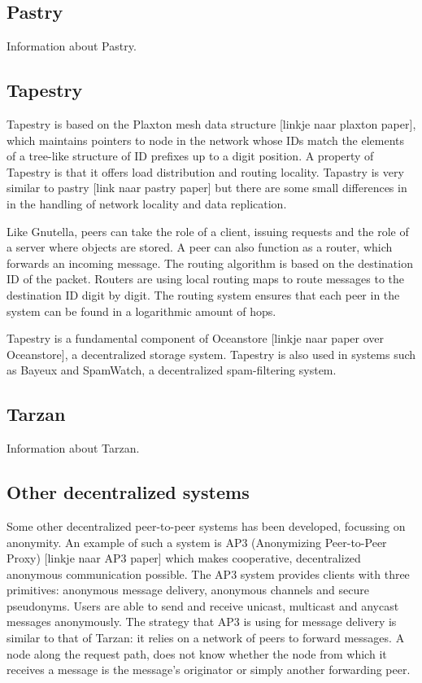 \documentclass[journal]{IEEEtran}
\begin{document}
		\subsection{Pastry}
			Information about Pastry.
		

		\subsection{Tapestry}
			Tapestry is based on the Plaxton mesh data structure [linkje naar plaxton paper], which maintains pointers to node in the network whose IDs match the elements of a tree-like structure of ID prefixes up to a digit position. A property of Tapestry is that it offers load distribution and routing locality. Tapastry is very similar to pastry [link naar pastry paper] but there are some small differences in in the handling of network locality and data replication.
		
			Like Gnutella, peers can take the role of a client, issuing requests and the role of a server where objects are stored. A peer can also function as a router, which forwards an incoming message. The routing algorithm is based on the destination ID of the packet. Routers are using local routing maps to route messages to the destination ID digit by digit. The routing system ensures that each peer in the system can be found in a logarithmic amount of hops.
		
			Tapestry is a fundamental component of Oceanstore [linkje naar paper over Oceanstore], a decentralized storage system. Tapestry is also used in systems such as Bayeux and SpamWatch, a decentralized spam-filtering system.
		
		\subsection{Tarzan}
			Information about Tarzan.
		
		\subsection{Other decentralized systems}
			Some other decentralized peer-to-peer systems has been developed, focussing on anonymity. An example of such a system is AP3 (Anonymizing Peer-to-Peer Proxy) [linkje naar AP3 paper] which makes cooperative, decentralized anonymous communication possible. The AP3 system provides clients with three primitives: anonymous message delivery, anonymous channels and secure pseudonyms. Users are able to send and receive unicast, multicast and anycast messages anonymously. The strategy that AP3 is using for message delivery is similar to that of Tarzan: it relies on a network of peers to forward messages. A node along the request path, does not know whether the node from which it receives a message is the message's originator or simply another forwarding peer.
	
\end{document}
